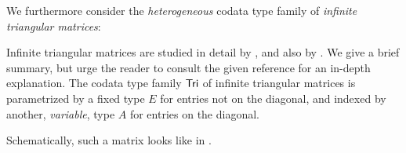 \documentclass[a4paper,USenglish]{lipics}
\begin{document}
We furthermore consider the \emph{heterogeneous} codata type family of \emph{infinite triangular matrices}:

\begin{ex}\label{ex_tri}
Infinite triangular matrices are studied in detail by
 \textcite{DBLP:conf/types/MatthesP11}, and also by \textcite{DBLP:journals/tcs/AbelMU05}.
 We give a brief summary, but urge the reader to consult the given reference 
 for an in-depth explanation. 
 The codata type family $\mathsf{Tri}$ of infinite triangular matrices 
 is parametrized by a fixed type $E$ for entries not on the diagonal, 
 and indexed by another, \emph{variable}, type $A$ for entries on 
 the diagonal. 
\begin{Long}
 Schematically, such a matrix looks like in .
 \begin{figure}[bt]
 \centering
\end{figure}
\end{Long}
\end{ex}
\end{document}
